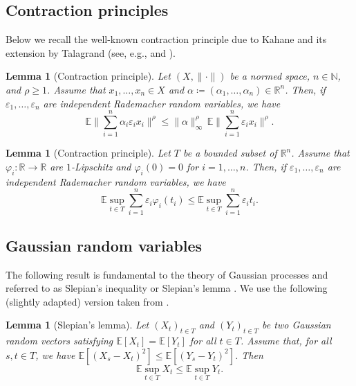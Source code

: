 \documentclass[a4paper]{amsart}
\newtheorem{lemma}[theorem]{Lemma}
\theoremstyle{definition}
\theoremstyle{remark}
\numberwithin{equation}{section}
\newcommand*{\RR}{\mathbb{R}}
\newcommand*{\NN}{\mathbb{N}}
\newcommand*{\EE}{\mathbb{E}}
\begin{document}
%
\subsection{Contraction principles}
%

Below we recall the well-known contraction
principle due to Kahane and its extension by Talagrand (see, e.g., \cite[Exercise 6.7.7]{V2018}  and \cite[Theorem~4.4 and the proof of Theorem~4.12]{Ledoux-Talagrand}).
\begin{lemma}[Contraction principle]\label{lem:contraction-principle}
Let $(X,\|\cdot\|)$ be a normed space, $n\in\NN$, and $\rho \ge 1$. Assume that $x_1,\dots,x_n\in X$ and $\alpha\coloneqq(\alpha_1,\dots,\alpha_n)\in\RR^n$. Then, if $\varepsilon_1,\dots,\varepsilon_n$ are independent Rademacher random variables, we have
\[
\EE\bigl\|\sum_{i=1}^n \alpha_i\varepsilon_ix_i \bigr\|^{\rho}  \leq \|\alpha\|_\infty^{ \rho}\, \EE \bigl\|\sum_{i=1}^n \varepsilon_ix_i \bigr\|^{ \rho}.
\]
\end{lemma}

\begin{lemma}[Contraction principle]\label{lem:contraction-principle2}
Let $T$ be a bounded subset of $\RR^n$. Assume that $\varphi_i:\RR\to\RR$ are $1$-Lipschitz and $\varphi_i(0)=0$ for $i=1,\ldots,n$.  Then, if $\varepsilon_1,\dots,\varepsilon_n$ are independent Rademacher random variables, we have
\[
\EE \sup_{t\in T}\sum_{i=1}^n \varepsilon_i\varphi_i(t_i) \leq  \EE \sup_{t\in T}\sum_{i=1}^n \varepsilon_it_i .
\]
\end{lemma}


%
\subsection{Gaussian random variables}
%

The following result is fundamental to the theory of Gaussian processes and referred to as Slepian's inequality or Slepian's lemma \cite{S1962}. We use the following (slightly adapted) version taken from \cite[Theorem 13.3]{BLM2013}.


\begin{lemma}[Slepian's lemma]
	\label{lem:Slepian}
	Let $(X_t)_{t\in T}$ and $(Y_t)_{t\in T}$  be two Gaussian random vectors satisfying $\EE[X_t]=\EE[Y_t]$ for all $t\in T$. Assume that, for all $s,t \in T$, we have $\EE[(X_s-X_t)^2] \leq \EE[(Y_s-Y_t)^2]$.
	Then
	\[
	\EE\sup_{t\in T} X_t   \leq \EE\sup_{t\in T} Y_t .
	\]
\end{lemma}
\end{document}
